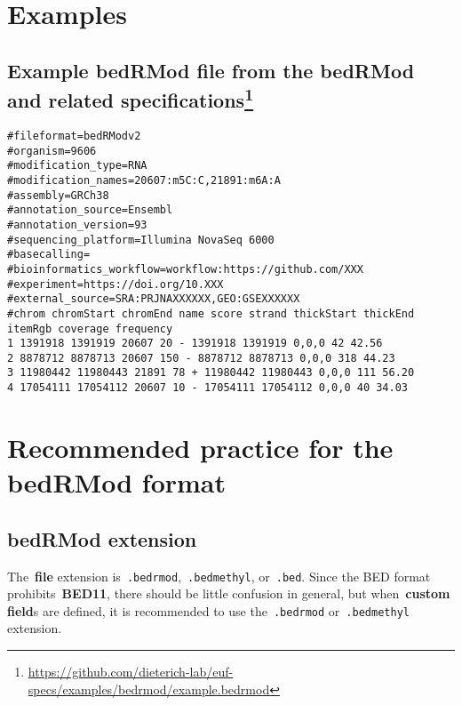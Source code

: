 \documentclass[11pt]{article}
\begin{document}
\section{Examples}

\subsection[title]{Example bedRMod file from the \acs{bedRMod} and related specifications\footnote{\url{https://github.com/dieterich-lab/euf-specs/examples/bedrmod/example.bedrmod}}}\label{sec:example-bedrmod}

\begin{verbatim}
#fileformat=bedRModv2
#organism=9606
#modification_type=RNA
#modification_names=20607:m5C:C,21891:m6A:A
#assembly=GRCh38
#annotation_source=Ensembl
#annotation_version=93
#sequencing_platform=Illumina NovaSeq 6000
#basecalling=
#bioinformatics_workflow=workflow:https://github.com/XXX
#experiment=https://doi.org/10.XXX
#external_source=SRA:PRJNAXXXXXX,GEO:GSEXXXXXX
#chrom chromStart chromEnd name score strand thickStart thickEnd itemRgb coverage frequency
1 1391918 1391919 20607 20 - 1391918 1391919 0,0,0 42 42.56
2 8878712 8878713 20607 150 - 8878712 8878713 0,0,0 318 44.23
3 11980442 11980443 21891 78 + 11980442 11980443 0,0,0 111 56.20
4 17054111 17054112 20607 10 - 17054111 17054112 0,0,0 40 34.03
\end{verbatim}

\section{Recommended practice for the \acs{bedRMod} format}

\subsection{\acs{bedRMod} extension}\label{sec:recommend-ext}
The~\textbf{file} extension is~\texttt{.bedrmod},~\texttt{.bedmethyl}, or~\texttt{.bed}. Since the \ac{BED} format prohibits~\textbf{BED11}, there should be little confusion in general, but when~\textbf{custom field}s are defined, it is recommended to use the~\texttt{.bedrmod} or~\texttt{.bedmethyl} extension.
\end{document}
